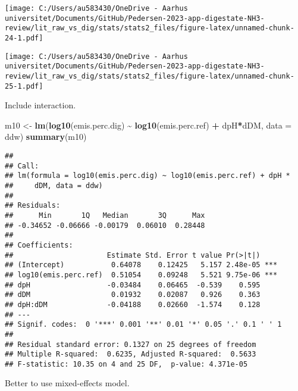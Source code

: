 \documentclass[
]{article}
\newenvironment{Shaded}{\begin{snugshade}}{\end{snugshade}}
\newcommand{\AttributeTok}[1]{\textcolor[rgb]{0.13,0.29,0.53}{#1}}
\newcommand{\DecValTok}[1]{\textcolor[rgb]{0.00,0.00,0.81}{#1}}
\newcommand{\FunctionTok}[1]{\textcolor[rgb]{0.13,0.29,0.53}{\textbf{#1}}}
\newcommand{\NormalTok}[1]{#1}
\newcommand{\OtherTok}[1]{\textcolor[rgb]{0.56,0.35,0.01}{#1}}
\newcommand{\SpecialCharTok}[1]{\textcolor[rgb]{0.81,0.36,0.00}{\textbf{#1}}}
\begin{document}
\texttt{[image: C:/Users/au583430/OneDrive - Aarhus universitet/Documents/GitHub/Pedersen-2023-app-digestate-NH3-review/lit\_raw\_vs\_dig/stats/stats2\_files/figure-latex/unnamed-chunk-24-1.pdf]}

\begin{Shaded}
\end{Shaded}

\texttt{[image: C:/Users/au583430/OneDrive - Aarhus universitet/Documents/GitHub/Pedersen-2023-app-digestate-NH3-review/lit\_raw\_vs\_dig/stats/stats2\_files/figure-latex/unnamed-chunk-25-1.pdf]}

Include interaction.

\begin{Shaded}
\begin{Highlighting}[]
\NormalTok{m10 }\OtherTok{\textless{}{-}} \FunctionTok{lm}\NormalTok{(}\FunctionTok{log10}\NormalTok{(emis.perc.dig) }\SpecialCharTok{\textasciitilde{}} \FunctionTok{log10}\NormalTok{(emis.perc.ref) }\SpecialCharTok{+}\NormalTok{ dpH}\SpecialCharTok{*}\NormalTok{dDM, }\AttributeTok{data =}\NormalTok{ ddw)}
\FunctionTok{summary}\NormalTok{(m10)}
\end{Highlighting}
\end{Shaded}

\begin{verbatim}
## 
## Call:
## lm(formula = log10(emis.perc.dig) ~ log10(emis.perc.ref) + dpH * 
##     dDM, data = ddw)
## 
## Residuals:
##      Min       1Q   Median       3Q      Max 
## -0.34652 -0.06666 -0.00179  0.06010  0.28448 
## 
## Coefficients:
##                      Estimate Std. Error t value Pr(>|t|)    
## (Intercept)           0.64078    0.12425   5.157 2.48e-05 ***
## log10(emis.perc.ref)  0.51054    0.09248   5.521 9.75e-06 ***
## dpH                  -0.03484    0.06465  -0.539    0.595    
## dDM                   0.01932    0.02087   0.926    0.363    
## dpH:dDM              -0.04188    0.02660  -1.574    0.128    
## ---
## Signif. codes:  0 '***' 0.001 '**' 0.01 '*' 0.05 '.' 0.1 ' ' 1
## 
## Residual standard error: 0.1327 on 25 degrees of freedom
## Multiple R-squared:  0.6235, Adjusted R-squared:  0.5633 
## F-statistic: 10.35 on 4 and 25 DF,  p-value: 4.371e-05
\end{verbatim}

Better to use mixed-effects model.
\end{document}
